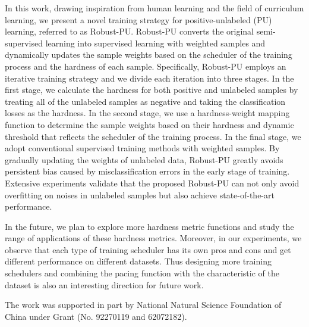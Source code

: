 \documentclass[sigconf]{acmart}
\newcommand{\ourmethod}{Robust-PU\xspace}
\begin{document}
In this work, drawing inspiration from human learning and the field of curriculum learning, we present a novel training strategy for positive-unlabeled (PU) learning, referred to as \ourmethod. \ourmethod converts the original semi-supervised learning into supervised learning with weighted samples and dynamically updates the sample weights based on the scheduler of the training process and the hardness of each sample. Specifically, \ourmethod employs an iterative training strategy and we divide each iteration into three stages. In the first stage, we calculate the hardness for both positive and unlabeled samples by treating all of the unlabeled samples as negative and taking the classification losses as the hardness. In the second stage, we use a hardness-weight mapping function to determine the sample weights based on their hardness and dynamic threshold that reflects the scheduler of the training process. In the final stage, we adopt conventional supervised training methods with weighted samples. By gradually updating the weights of unlabeled data, \ourmethod greatly avoids persistent bias caused by misclassification errors in the early stage of training. Extensive experiments validate that the proposed \ourmethod can not only avoid overfitting on noises in unlabeled samples but also achieve state-of-the-art performance.

In the future, we plan to explore more hardness metric functions and study the range of applications of these hardness metrics. Moreover, in our experiments, we observe that each type of training scheduler has its own pros and cons and get different performance on different datasets. Thus designing more training schedulers and combining the pacing function with the characteristic of the dataset is also an interesting direction for future work.

\begin{acks}
The work was supported in part by National Natural Science Foundation of China under Grant (No. 92270119 and 62072182).
\end{acks}


\balance


\appendix
\end{document}
